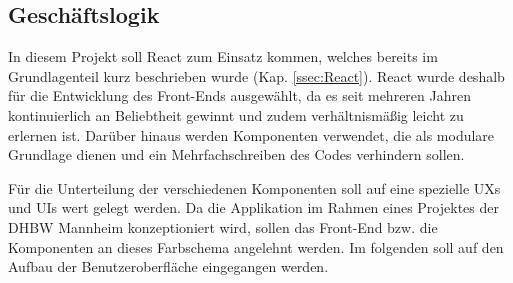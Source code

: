 
\subsection{Geschäftslogik}
\label{ssec:GeschaeftslogikClient}

In diesem Projekt soll React zum Einsatz kommen, welches bereits im Grundlagenteil kurz beschrieben wurde (Kap. \vref{ssec:React}).
React wurde \ua deshalb für die Entwicklung des Front-Ends ausgewählt, da es seit mehreren Jahren kontinuierlich an Beliebtheit gewinnt\autocite[vgl.][]{stackoverflow_Top_Frameworks} und zudem verhältnismäßig leicht zu erlernen ist.
Darüber hinaus werden Komponenten verwendet, die als modulare Grundlage dienen und ein Mehrfachschreiben des Codes verhindern sollen. 

Für die Unterteilung der verschiedenen Komponenten soll auf eine spezielle \acfp{UX} und \acfp{UI} wert gelegt werden. 
Da die Applikation im Rahmen eines Projektes der DHBW Mannheim konzeptioniert wird, sollen das Front-End bzw. die Komponenten an dieses Farbschema angelehnt werden. 
Im folgenden soll auf den Aufbau der Benutzeroberfläche eingegangen werden. 